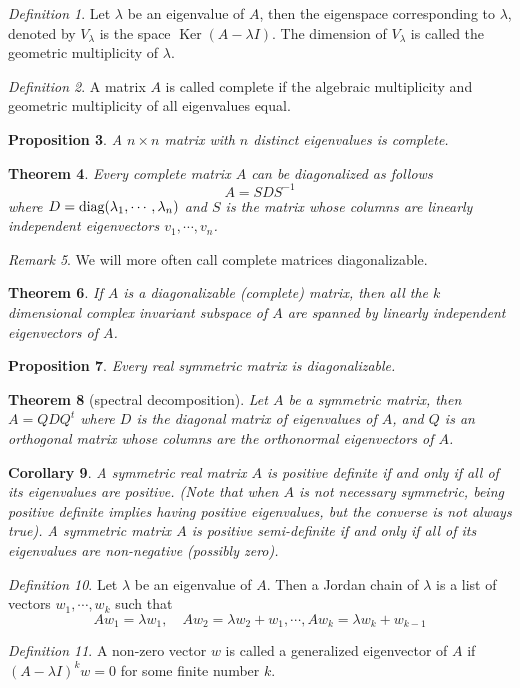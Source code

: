 \documentclass[12pt]{amsart}
\renewcommand{\ker}{\Ker}
\DeclareMathOperator{\Ker}{Ker}
\newtheorem{theorem}{Theorem}[section]
\newtheorem{proposition}[theorem]{Proposition}
\newtheorem{corollary}[theorem]{Corollary}
\theoremstyle{remark}
\newtheorem{remark}[theorem]{Remark}
\newtheorem{definition}[theorem]{Definition}
\numberwithin{equation}{section}
\begin{document}
	\begin{definition}
		Let $\lambda$ be an eigenvalue of $A$, then the eigenspace corresponding to $\lambda$, denoted by $V_\lambda$ is the space $\ker(A-\lambda I)$. The dimension of $V_\lambda$ is called the geometric multiplicity of $\lambda$.
	\end{definition}
	
	\begin{definition}
		A matrix $A$ is called complete if the algebraic multiplicity and geometric multiplicity of all eigenvalues equal.
	\end{definition}
	\begin{proposition}
		A $n\times n$ matrix with $n$ distinct eigenvalues is complete.
	\end{proposition}
	\begin{theorem}
		Every complete matrix $A$ can be diagonalized as follows
		\[A=S D S^{-1}\]
		where $D=\textup{diag}{(\lambda_1,\cdots,\lambda_n)}$ and $S$ is the matrix whose columns are linearly independent eigenvectors $v_1,\cdots,v_n$.
	\end{theorem}
	\begin{remark}
		We will more often call complete matrices diagonalizable.
	\end{remark}
	\begin{theorem}
		If $A$ is a diagonalizable (complete) matrix, then all the $k$ dimensional complex invariant subspace of $A$ are spanned by linearly independent eigenvectors of $A$.
	\end{theorem}
	\begin{proposition}
		Every real symmetric matrix is diagonalizable.
	\end{proposition}
	\begin{theorem}[spectral decomposition]
		Let $A$ be a symmetric matrix, then
		$A=Q D Q^t$
		where $D$ is the diagonal matrix of eigenvalues of $A$, and $Q$ is an orthogonal matrix whose columns are the orthonormal eigenvectors of $A$.
	\end{theorem}
	\begin{corollary}
		A symmetric real matrix $A$ is positive definite if and only if all of its eigenvalues are positive. (Note that when $A$ is not necessary symmetric, being positive definite implies having positive eigenvalues, but the converse is not always true). A symmetric matrix $A$ is positive semi-definite if and only if all of its eigenvalues are non-negative (possibly zero).
	\end{corollary}
	\begin{definition}
	Let $\lambda$ be an eigenvalue of $A$. Then
		a Jordan chain of $\lambda$ is a list of vectors $w_1,\cdots,w_k$ such that
		\[A w_1=\lambda w_1,\quad Aw_2=\lambda w_2+w_1,\cdots, A w_k = \lambda w_k+w_{k-1}\]
	\end{definition}
	\begin{definition}
		A non-zero vector $w$ is called a generalized eigenvector of $A$ if $(A-\lambda I)^kw=0$ for some finite number $k$.
	\end{definition}
	
\end{document}
